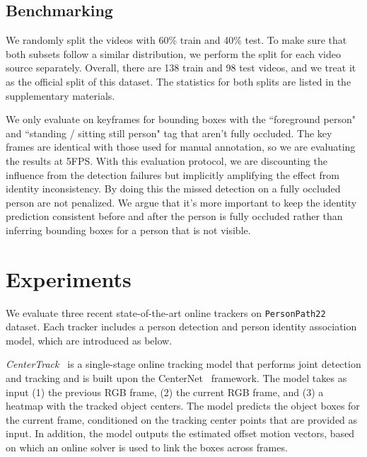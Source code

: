 \documentclass[runningheads]{llncs}
\begin{document}
\subsection{Benchmarking} \label{sec:benchmark}
We randomly split the videos with 60\% train and 40\% test. 
To make sure that both subsets follow a similar distribution, we perform the split for each video source separately. Overall, there are 138 train and 98 test videos, and we treat it as the official split of this dataset. The statistics for both splits are listed in the supplementary materials.



We only evaluate on keyframes for bounding boxes with the ``foreground person" and ``standing / sitting still person" tag that aren't fully occluded. The key frames are identical with those used for manual annotation, so we are evaluating the results at 5FPS. With this evaluation protocol, we are discounting the influence from the detection failures but implicitly amplifying the effect from identity inconsistency. By doing this the missed detection on a fully occluded person are not penalized. We argue that it's more important to keep the identity prediction consistent before and after the person is fully occluded rather than inferring bounding boxes for a person that is not visible.








%
  
\section{Experiments}\label{sec:experiments}


We evaluate three recent state-of-the-art online trackers on \texttt{PersonPath22} dataset. Each tracker includes a person detection and person identity association model, which are introduced as below.


\textit{CenterTrack~\cite{centertrack}} is a single-stage online tracking model that performs joint detection and tracking and is built upon the CenterNet~\cite{centernet} framework. The model takes as input (1) the previous RGB frame, (2) the current RGB frame, and (3) a heatmap with the tracked object centers. The model predicts the object boxes for the current frame, conditioned on the tracking center points that are provided as input. In addition, the model outputs the estimated offset motion vectors, based on which an online solver is used to link the boxes across frames.
\end{document}

